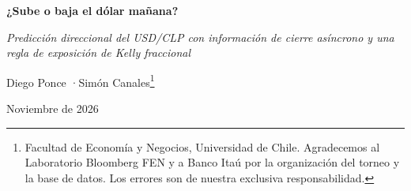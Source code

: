 \documentclass[11pt,a4paper]{article}
\newcommand{\titulo}{¿Sube o baja el dólar mañana?}
\newcommand{\subtitulo}{Predicción direccional del USD/CLP con información de cierre asíncrono y una regla de exposición de Kelly fraccional}
\newcommand{\autores}{Diego Ponce \quad·\quad Simón Canales}
\begin{document}
\thispagestyle{plain}
\begin{center}
{\Large\bfseries \titulo\par}
\vspace{0.3cm}
{\normalsize\itshape \subtitulo\par}
\vspace{0.5cm}
{\normalsize \autores\footnote{Facultad de Economía y Negocios, Universidad de Chile. Agradecemos al Laboratorio Bloomberg FEN y a Banco Itaú por la organización del torneo y la base de datos. Los errores son de nuestra exclusiva responsabilidad.}\par}
\vspace{0.2cm}
{\small Noviembre de 2026\par}
\end{center}
\vspace{0.6cm}
\end{document}
